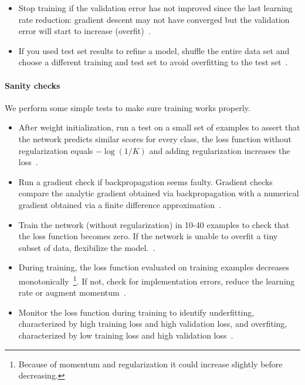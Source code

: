 \begin{itemize}
	\item Stop training if the validation error has not improved since the last learning rate reduction: gradient descent may not have converged but the validation error will start to increase (overfit)~\cite{Bengio2012}.

	\item If you used test set results to refine a model, shuffle the entire data set and choose a different training and test set to avoid overfitting to the test set~\cite{Ng2014}.
\end{itemize}


\paragraph{Sanity checks}
We perform some simple tests to make sure training works properly.
\begin{itemize}
	\item After weight initialization, run a test on a small set of examples to assert that the network predicts similar scores for every class, the loss function without regularization equals $-\log(1/K)$ and adding regularization increases the loss~\cite{Karpathy2016}.

	\item Run a gradient check if backpropagation seems faulty. Gradient checks compare the analytic gradient obtained via backpropagation with a numerical gradient obtained via a finite difference approximation~\cite{Karpathy2016}.

	\item Train the network (without regularization) in 10-40 examples to check that the loss function becomes zero. If the network is unable to overfit a tiny subset of data, flexibilize the model.~\cite{Ng2014}.

	\item During training, the loss function evaluated on training examples decreases monotonically~\footnote{Because of momentum and regularization it could increase slightly before decreasing.}. If not, check for implementation errors, reduce the learning rate or augment momentum~\cite{Karpathy2016}.

	\item Monitor the loss function during training to identify underfitting, characterized by high training loss and high validation loss, and overfiting, characterized by low training loss and high validation loss~\cite{Ng2014}.
\end{itemize}

